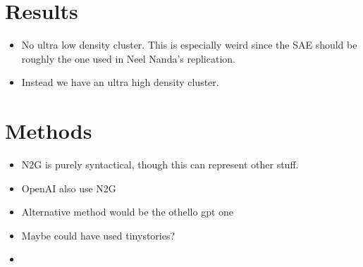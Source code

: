 \section{Results}
\begin{itemize}
    \item No ultra low density cluster. This is especially weird since the SAE should be roughly the one used in Neel Nanda's replication.
    \item Instead we have an ultra high density cluster.
\end{itemize}

\section{Methods}
\begin{itemize}
    \item N2G is purely syntactical, though this can represent other stuff.
    \item OpenAI also use N2G
    \item Alternative method would be the othello gpt one
    \item Maybe could have used tinystories?
    \item 
\end{itemize}